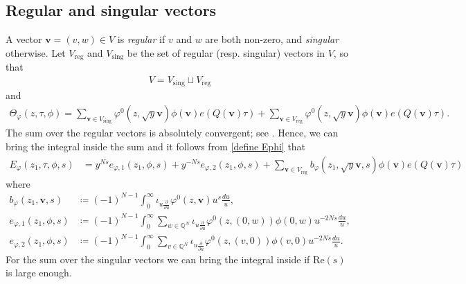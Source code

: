 \documentclass[twoside,a4paper,10pt]{article} %
\newcommand{\iotau}{\iota_{u\frac{\partial}{\partial u}}}
\newcommand{\8}{\infty}
\newcommand{\vbf}{\mathbf{v}}
\newcommand{\Q}{\mathbb{Q}}
\newcommand{\sing}{\mathrm{sing}}
\newcommand{\reg}{\mathrm{reg}}
\newcommand{\re}{\mathrm{Re}}
\theoremstyle{mytheoremstyle}
\theoremstyle{remark}
\numberwithin{equation}{section}
\begin{document}
\subsection{Regular and singular vectors} A vector $\vbf=(v,w) \in V$ is {\em regular} if $v$ and $w$ are both non-zero, and {\em singular} otherwise. Let $V_{\reg}$ and $V_{\sing}$ be the set of regular (resp. singular) vectors in $V$, so that 
\begin{align}
V=V_{\sing} \sqcup V_{\reg}
\end{align}
and
\begin{align}
\Theta_{\varphi}(z,\tau,\phi)=\sum_{\vbf \in V_{\sing}} \varphi^0(z,\sqrt{y}\vbf) \phi(\vbf) e(Q(\vbf)\tau)+\sum_{\vbf \in V_{\reg}} \varphi^0(z,\sqrt{y}\vbf) \phi(\vbf) e(Q(\vbf)\tau).
\end{align}The sum over the regular vectors is absolutely convergent; see \cite[Lemma.~4.7]{rbrsln}. Hence, we can bring the integral inside the sum and it follows from \eqref{define Ephi} that
\begin{align} \label{fourier Ephi}
E_\varphi(z_1,\tau,\phi,s)& =y^{Ns}e_{\varphi,1}(z_1,\phi,s)+y^{-Ns}e_{\varphi,2}(z_1,\phi,s)  +\sum_{\vbf \in V_\reg} b_\varphi(z_1,\sqrt{y}\vbf,s) \phi(\vbf) e(Q(\vbf)\tau) \qquad \qquad
\end{align}
where
\begin{align}
b_\varphi(z_1,\vbf,s) &\coloneqq (-1)^{N-1}\int_0^\8 \iotau \varphi^0(z,\vbf) u^s \frac{du}{u}, \\
e_{\varphi,1}(z_1,\phi,s) &\coloneqq (-1)^{N-1}  \int_0^\8  \sum_{w \in \Q^N}\iotau \varphi^0(z,(0,w)) \phi(0,w) u^{-2Ns} \frac{du}{u},\\
e_{\varphi,2}(z_1,\phi,s) &\coloneqq (-1)^{N-1}  \int_0^\8 \sum_{v \in \Q^N}\iotau \varphi^0(z,(v,0)) \phi(v,0) u^{-2Ns}\frac{du}{u}.
\end{align}
For the sum over the singular vectors we can bring the integral inside if $\re(s)$ is large enough.
\end{document}
